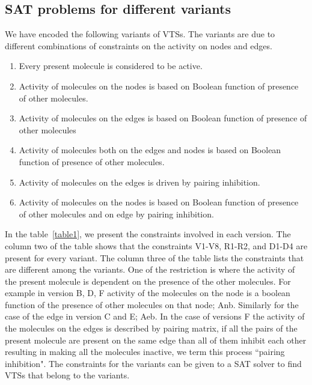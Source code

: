 
\subsection{SAT problems for different variants}

We have encoded the following variants of VTSs.
%
The variants are due to different combinations of constraints on the
activity on nodes and edges.
%
\begin{enumerate}[label=\Alph*]
\item Every present molecule is considered to be active.
\item Activity of molecules on the nodes is based on Boolean function of presence of other molecules. 
\item Activity of molecules on the edges is based on Boolean function of presence of other molecules
\item Activity of molecules both on the edges and nodes is based on Boolean function of presence of other molecules.
\item Activity of molecules on the edges is driven by pairing inhibition.
\item Activity of molecules on the nodes is based on Boolean function of presence of other molecules and on edge by pairing inhibition.
\end{enumerate}
%
%
In the table~\ref{table1}, we present the constraints involved in each version.
%
The column two of the table shows that the constraints V1-V8, R1-R2, and D1-D4 are present
for every variant.
%
The column three of the table lists the constraints that are different among the variants.
%
%
One of the restriction is where the activity of the present molecule is dependent on the presence of the other molecules.
%
For example in version B, D, F activity of the molecules on the node is a boolean function of the presence of other molecules on that node; Anb.
%
Similarly for the case of the edge in version C and E; Aeb.
%
In the case of versions F the activity of the molecules on the edges
is described by pairing matrix, if all the pairs of the present
molecule are present on the same edge than all of them inhibit each
other resulting in making all the molecules inactive, we term this
process ``pairing inhibition".
%
The constraints for the variants can be given to a SAT solver to find
VTSs that belong to the variants.


